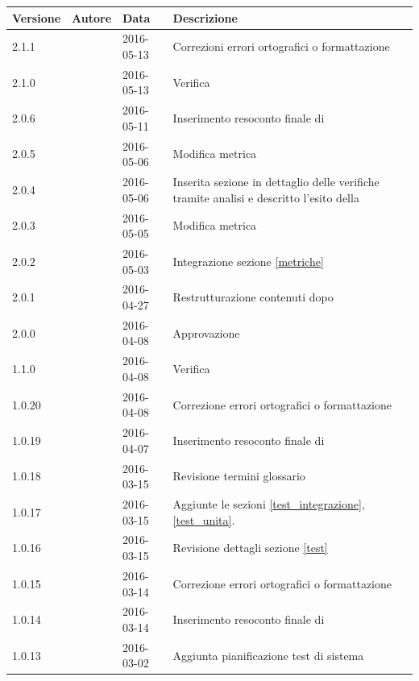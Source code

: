 \documentclass[12pt,a4paper]{article}
\begin{document}
	\begin{center}
		\begin{longtable}[H]{p{} p{} p{} p{}}
			\toprule
			\textbf{Versione}	&	\textbf{Autore}	&	\textbf{Data}	&	\textbf{Descrizione}\\*
			\midrule
			\midrule
			2.1.1 & \AB & 2016-05-13 & Correzioni errori ortografici o formattazione\\*
			\midrule
			2.1.0 & \AB & 2016-05-13 & Verifica\\*
			\midrule
			2.0.6 & \AB & 2016-05-11 & Inserimento resoconto finale di \FC\\*
			\midrule
			2.0.5 & \AB & 2016-05-06 & Modifica metrica \mgls{milestone schedule variance} \\*
			\midrule
			2.0.4 & \WS & 2016-05-06 & Inserita sezione \FC in dettaglio delle verifiche tramite analisi e descritto l'esito della \RP\\*
			\midrule
			2.0.3 & \AB & 2016-05-05 & Modifica metrica \mgls{cost of poor quality}\\*
			\midrule
			2.0.2 & \AB & 2016-05-03 & Integrazione sezione \ref{metriche}\\*
			\midrule
				2.0.1 & \AB & 2016-04-27 & Restrutturazione contenuti dopo \RP{}\\*
			\midrule
			2.0.0 & \TP & 2016-04-08 & Approvazione\\*
			\midrule
			1.1.0 & \AVE & 2016-04-08 & Verifica\\*
			\midrule
			1.0.20 & \TP & 2016-04-08 & Correzione errori ortografici o formattazione \\*
			\midrule
			1.0.19 & \TP & 2016-04-07 & Inserimento resoconto finale di \FPD \\*
			\midrule
			1.0.18 & \TP & 2016-03-15 & Revisione termini glossario \\*
			\midrule
			1.0.17 & \TP & 2016-03-15 & Aggiunte le sezioni \ref{test_integrazione}, \ref{test_unita}.\\*
			\midrule
			1.0.16 & \TP & 2016-03-15 & Revisione dettagli sezione \ref{test}\\*
			\midrule
			1.0.15 & \AB & 2016-03-14 & Correzione errori ortografici o formattazione \\*
			\midrule
			1.0.14 & \AB & 2016-03-14 & Inserimento resoconto finale di \FPA \\*
			\midrule
			1.0.13 & \AB & 2016-03-02 & Aggiunta pianificazione test di sistema\\*
			\midrule

\end{longtable}
\end{center}
\end{document}
